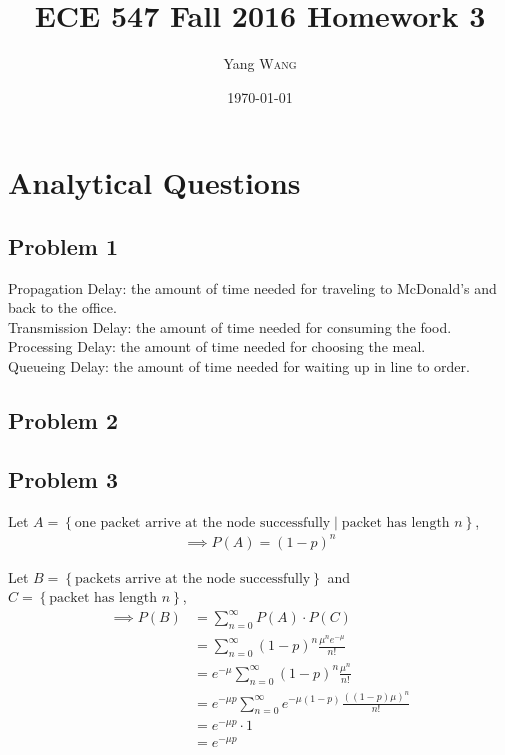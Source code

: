 \documentclass{article}
\title{ECE 547 Fall 2016 Homework 3} %
\author{Yang \textsc{Wang}}  %
\date{\today} %
\begin{document}
\maketitle %


\section*{Analytical Questions}
	\subsection*{Problem 1}

		Propagation Delay: the amount of time needed for traveling to McDonald's and
		back to the office. \\
		Transmission Delay: the amount of time needed for consuming the food. \\
		Processing Delay: the amount of time needed for choosing the meal. \\
		Queueing Delay: the amount of time needed for waiting up in line to order.

	\subsection*{Problem 2}

	\subsection*{Problem 3}

		Let $A = \left\{ \text{one packet arrive at the node successfully} \mid \text{packet has length } n \right\}$,
		\begin{gather*}
			\implies P(A) = (1-p)^{n}
		\end{gather*}

		Let $B = \left\{ \text{packets arrive at the node successfully} \right\}$
		and $C = \left\{ \text{packet has length } n \right\} $,
		\begin{align*}
			\implies P(B) &= \sum_{n = 0}^{\infty} P(A) \cdot P(C) \\
			&= \sum_{n = 0}^{\infty} (1-p)^{n} \frac{\mu^{n}e^{-\mu}}{n!} \\
			&= e^{-\mu} \sum_{n = 0}^{\infty} (1-p)^{n} \frac{\mu^{n}}{n!} \\
			&= e^{-\mu p} \sum_{n = 0}^{\infty} e^{-\mu (1-p)} \frac{((1-p)\mu)^{n}}{n!} \\
			&= e^{-\mu p} \cdot 1 \\
			&= e^{-\mu p}
		\end{align*}
\end{document}
